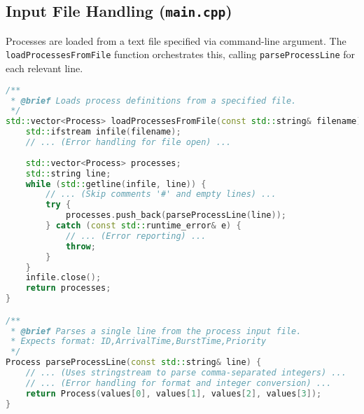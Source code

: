 \documentclass[12pt]{article}
\begin{document}
\subsection{Input File Handling (\texttt{main.cpp})}
Processes are loaded from a text file specified via command-line argument. The \texttt{loadProcessesFromFile} function orchestrates this, calling \texttt{parseProcessLine} for each relevant line.
\begin{lstlisting}[language=C++, caption={Input File Parsing Logic (main.cpp - Snippet)}, style=cppstyle]
/**
 * @brief Loads process definitions from a specified file.
 */
std::vector<Process> loadProcessesFromFile(const std::string& filename) {
    std::ifstream infile(filename);
    // ... (Error handling for file open) ...
    
    std::vector<Process> processes;
    std::string line;
    while (std::getline(infile, line)) {
        // ... (Skip comments '#' and empty lines) ...
        try {
            processes.push_back(parseProcessLine(line));
        } catch (const std::runtime_error& e) {
            // ... (Error reporting) ...
            throw; 
        }
    }
    infile.close();
    return processes;
}

/**
 * @brief Parses a single line from the process input file.
 * Expects format: ID,ArrivalTime,BurstTime,Priority
 */
Process parseProcessLine(const std::string& line) {
    // ... (Uses stringstream to parse comma-separated integers) ...
    // ... (Error handling for format and integer conversion) ...
    return Process(values[0], values[1], values[2], values[3]);
}
\end{lstlisting}
\end{document}
